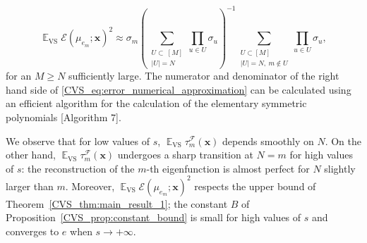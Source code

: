 \documentclass[twoside,11pt]{book}
\numberwithin{theorem}{chapter}
\numberwithin{definition}{chapter}
\numberwithin{proposition}{chapter}
\numberwithin{corollary}{chapter}
\numberwithin{example}{chapter}
\numberwithin{lemma}{chapter}
\numberwithin{assumption}{chapter}
\DeclareMathOperator{\VS}{\mathrm{VS}}
\DeclareMathOperator{\EX}{\mathbb{E}}
\DeclareMathOperator{\F}{\mathcal{F}}
\begin{document}
\begin{equation}\label{CVS_eq:error_numerical_approximation}
\EX_{\VS} \mathcal{E}(\mu_{e_{m}};\bm{x})^{2} \approx \sigma_{m} \left(\sum\limits_{\substack{U \subset \: [M]\\ |U|=N}} \prod\limits_{u \in U} \sigma_{u} \right)^{-1}  \sum\limits_{\substack{U \subset [M]\\ |U|=N, \: m \notin U}} \prod\limits_{u \in U} \sigma_{u},
\end{equation}
for an $M \geq N$ sufficiently large. The numerator and denominator of the right hand side of \eqref{CVS_eq:error_numerical_approximation} can be calculated using an efficient algorithm for the calculation of the elementary symmetric polynomials \citep{KuTa12}[Algorithm 7].

 


We observe that for low values of $s$, $\EX_{\VS} \tau_{m}^{\F}(\bm{x})$ depends smoothly on $N$. On the other hand, $\EX_{\VS} \tau_{m}^{\F}(\bm{x})$ undergoes a sharp transition at $N = m$ for high values of $s$: the reconstruction of the $m$-th eigenfunction is almost perfect for $N$ slightly larger than $m$. Moreover, $\EX_{\VS} \mathcal{E}(\mu_{e_{m}};\bm{x})^{2}$ respects the upper bound of Theorem~\ref{CVS_thm:main_result_1};
the constant $B$ of Proposition~\ref{CVS_prop:constant_bound} is small for high values of $s$ and converges to $e$ when $s \rightarrow +\infty$.
\end{document}
